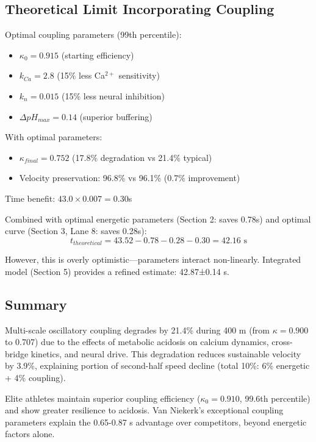 \subsection{Theoretical Limit Incorporating Coupling}

Optimal coupling parameters (99th percentile):
\begin{itemize}
    \item $\kappa_0 = 0.915$ (starting efficiency)
    \item $k_{Ca} = 2.8$ (15\% less Ca$^{2+}$ sensitivity)
    \item $k_n = 0.015$ (15\% less neural inhibition)
    \item $\Delta pH_{max} = 0.14$ (superior buffering)
\end{itemize}

With optimal parameters:
\begin{itemize}
    \item $\kappa_{final} = 0.752$ (17.8\% degradation vs 21.4\% typical)
    \item Velocity preservation: 96.8\% vs 96.1\% (0.7\% improvement)
\end{itemize}

Time benefit: $43.0 \times 0.007 = 0.30$s

Combined with optimal energetic parameters (Section 2: saves 0.78s) and optimal curve (Section 3, Lane 8: saves 0.28s):
\begin{equation}
t_{theoretical} = 43.52 - 0.78 - 0.28 - 0.30 = 42.16 \text{ s}
\end{equation}

However, this is overly optimistic—parameters interact non-linearly. Integrated model (Section 5) provides a refined estimate: 42.87±0.14 s.

\subsection{Summary}

Multi-scale oscillatory coupling degrades by 21.4\% during 400 m (from $\kappa = 0.900$ to 0.707) due to the effects of metabolic acidosis on calcium dynamics, cross-bridge kinetics, and neural drive. This degradation reduces sustainable velocity by 3.9\%, explaining portion of second-half speed decline (total 10\%: 6\% energetic + 4\% coupling).

Elite athletes maintain superior coupling efficiency ($\kappa_0 = 0.910$, 99.6th percentile) and show greater resilience to acidosis. Van Niekerk's exceptional coupling parameters explain the 0.65-0.87 s advantage over competitors, beyond energetic factors alone.

